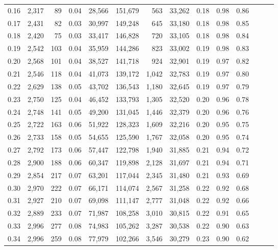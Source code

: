 \begin{tabular}{rrrrrrrrrrrrrr}
0.16 &  2,317 &   89 &  0.04 &   28,566 &  151,679 &     563 &  33,262 &  0.18 &  0.98 &      0.86 \\
0.17 &  2,431 &   82 &  0.03 &   30,997 &  149,248 &     645 &  33,180 &  0.18 &  0.98 &      0.85 \\
0.18 &  2,420 &   75 &  0.03 &   33,417 &  146,828 &     720 &  33,105 &  0.18 &  0.98 &      0.84 \\
0.19 &  2,542 &  103 &  0.04 &   35,959 &  144,286 &     823 &  33,002 &  0.19 &  0.98 &      0.83 \\
0.20 &  2,568 &  101 &  0.04 &   38,527 &  141,718 &     924 &  32,901 &  0.19 &  0.97 &      0.82 \\
0.21 &  2,546 &  118 &  0.04 &   41,073 &  139,172 &   1,042 &  32,783 &  0.19 &  0.97 &      0.80 \\
0.22 &  2,629 &  138 &  0.05 &   43,702 &  136,543 &   1,180 &  32,645 &  0.19 &  0.97 &      0.79 \\
0.23 &  2,750 &  125 &  0.04 &   46,452 &  133,793 &   1,305 &  32,520 &  0.20 &  0.96 &      0.78 \\
0.24 &  2,748 &  141 &  0.05 &   49,200 &  131,045 &   1,446 &  32,379 &  0.20 &  0.96 &      0.76 \\
0.25 &  2,722 &  163 &  0.06 &   51,922 &  128,323 &   1,609 &  32,216 &  0.20 &  0.95 &      0.75 \\
0.26 &  2,733 &  158 &  0.05 &   54,655 &  125,590 &   1,767 &  32,058 &  0.20 &  0.95 &      0.74 \\
0.27 &  2,792 &  173 &  0.06 &   57,447 &  122,798 &   1,940 &  31,885 &  0.21 &  0.94 &      0.72 \\
0.28 &  2,900 &  188 &  0.06 &   60,347 &  119,898 &   2,128 &  31,697 &  0.21 &  0.94 &      0.71 \\
0.29 &  2,854 &  217 &  0.07 &   63,201 &  117,044 &   2,345 &  31,480 &  0.21 &  0.93 &      0.69 \\
0.30 &  2,970 &  222 &  0.07 &   66,171 &  114,074 &   2,567 &  31,258 &  0.22 &  0.92 &      0.68 \\
0.31 &  2,927 &  210 &  0.07 &   69,098 &  111,147 &   2,777 &  31,048 &  0.22 &  0.92 &      0.66 \\
0.32 &  2,889 &  233 &  0.07 &   71,987 &  108,258 &   3,010 &  30,815 &  0.22 &  0.91 &      0.65 \\
0.33 &  2,996 &  277 &  0.08 &   74,983 &  105,262 &   3,287 &  30,538 &  0.22 &  0.90 &      0.63 \\
0.34 &  2,996 &  259 &  0.08 &   77,979 &  102,266 &   3,546 &  30,279 &  0.23 &  0.90 &      0.62 \\

\end{tabular}
